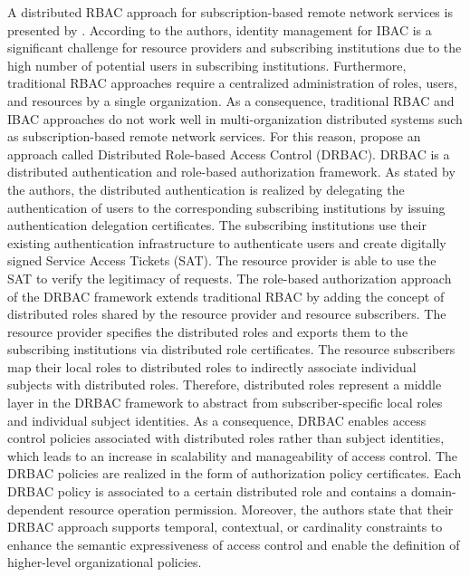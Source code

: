 A distributed RBAC approach for subscription-based remote network services is presented by \citeauthor{Ma2006} \cite{Ma2006a,Ma2006}.
According to the authors, identity management for IBAC is a significant challenge for resource providers and subscribing institutions due to the high number of potential users in subscribing institutions.
Furthermore, traditional RBAC approaches require a centralized administration of roles, users, and resources by a single organization.
As a consequence, traditional RBAC and IBAC approaches do not work well in multi-organization distributed systems such as subscription-based remote network services.
For this reason, \citeauthor{Ma2006} propose an approach called Distributed Role-based Access Control (DRBAC).
DRBAC is a distributed authentication and role-based authorization framework.
As stated by the authors, the distributed authentication is realized by delegating the authentication of users to the corresponding subscribing institutions by issuing authentication delegation certificates.
The subscribing institutions use their existing authentication infrastructure to authenticate users and create digitally signed Service Access Tickets (SAT).
The resource provider is able to use the SAT to verify the legitimacy of requests.
The role-based authorization approach of the DRBAC framework extends traditional RBAC by adding the concept of distributed roles shared by the resource provider and resource subscribers.
The resource provider specifies the distributed roles and exports them to the subscribing institutions via distributed role certificates.
The resource subscribers map their local roles to distributed roles to indirectly associate individual subjects with distributed roles.
Therefore, distributed roles represent a middle layer in the DRBAC framework to abstract from subscriber-specific local roles and individual subject identities.
As a consequence, DRBAC enables access control policies associated with distributed roles rather than subject identities, which leads to an increase in scalability and manageability of access control.
The DRBAC policies are realized in the form of authorization policy certificates.
Each DRBAC policy is associated to a certain distributed role and contains a domain-dependent resource operation permission.
Moreover, the authors state that their DRBAC approach supports temporal, contextual, or cardinality constraints to enhance the semantic expressiveness of access control and enable the definition of higher-level organizational policies.

